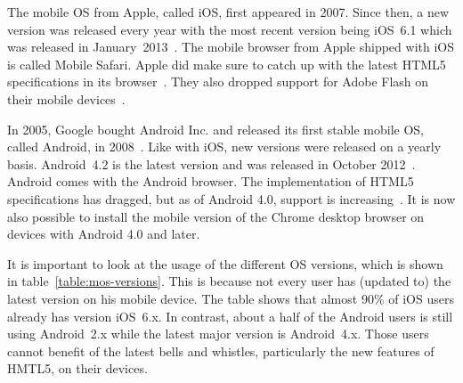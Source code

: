 \documentclass[a4paper]{artikel3}
\begin{document}
The mobile OS from Apple, called iOS, first appeared in 2007.
Since then, a new version was released every year with the most recent version being iOS~6.1 which was released in January~2013~\cite{Deitel2012,PhilDutson2012,Apple2013}.
The mobile browser from Apple shipped with iOS is called Mobile Safari.
Apple did make sure to catch up with the latest HTML5 specifications in its browser~\cite{Hales2012}.
They also dropped support for Adobe Flash on their mobile devices~\cite{Jobs2010}.

In 2005, Google bought Android Inc. and released its first stable mobile OS, called Android, in 2008~\cite{Satyesh2012}.
Like with iOS, new versions were released on a yearly basis.
Android~4.2 is the latest version and was released in October 2012~\cite{Sawers2012}.
Android comes with the Android browser.
The implementation of HTML5 specifications has dragged, but as of Android 4.0, support is increasing~\cite{Hales2012}.
It is now also possible to install the mobile version of the Chrome desktop browser on devices with Android 4.0 and later.

It is important to look at the usage of the different OS versions, which is shown in table~\ref{table:mos-versions}.
This is because not every user has (updated to) the latest version on his mobile device.
The table shows that almost 90\% of iOS users already has version iOS~6.x.
In contrast, about a half of the Android users is still using Android~2.x while the latest major version is Android~4.x. 
Those users cannot benefit of the latest bells and whistles, particularly the new features of HMTL5, on their devices.

\begin{table}[t]
\centering
{}
\quad
{}
\caption{Usage of iOS versions on May 8, 2013 and Android versions on May 1, 2013 \protect\cite{Smith2013,Android2013}.}
\label{table:mos-versions}
\end{table}
\end{document}
